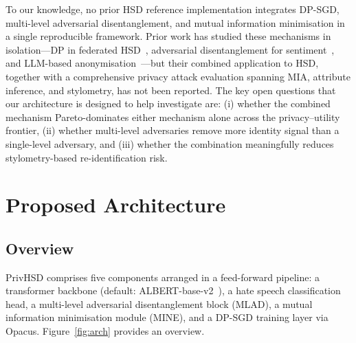 \documentclass{article}
\begin{document}
To our knowledge, no prior HSD reference implementation integrates
DP-SGD, multi-level adversarial disentanglement, and mutual information
minimisation in a single reproducible framework. Prior work has studied
these mechanisms in isolation---DP in federated HSD~\cite{bueno2025privacy},
adversarial disentanglement for sentiment~\cite{faustini2025idt}, and LLM-based
anonymisation~\cite{frikha2025incognitext}---but their combined application to
HSD, together with a comprehensive privacy attack evaluation spanning
MIA, attribute inference, and stylometry, has not been reported.
The key open questions that our architecture is designed to help investigate
are: (i) whether the combined mechanism Pareto-dominates either mechanism
alone across the privacy--utility frontier, (ii) whether multi-level adversaries
remove more identity signal than a single-level adversary, and (iii) whether
the combination meaningfully reduces stylometry-based re-identification risk.


\section{Proposed Architecture}
\label{sec:method}

\subsection{Overview}

PrivHSD comprises five components arranged in a feed-forward pipeline:
a transformer backbone (default: ALBERT-base-v2~\cite{lan2020albert}), a hate speech
classification head, a multi-level adversarial disentanglement block
(MLAD), a mutual information minimisation module (MINE), and a
DP-SGD training layer via Opacus.
Figure~\ref{fig:arch} provides an overview.
\end{document}
